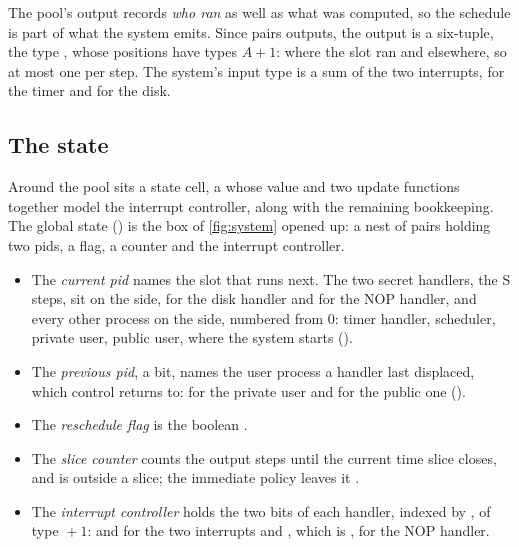 The pool's output records \emph{who ran} as well as what was computed, so the schedule
is part of what the system emits. Since  pairs outputs, the output is a
six-tuple, the type , whose positions have types $A + 1$:  where
the slot ran and  elsewhere, so at most one  per step. The
system's input type  is a sum of the two interrupts,  for the timer
and  for the disk.

\subsection{The state}\label{sec:global-state}\label{sec:state}

Around the pool sits a state cell, a  whose value and two update
functions together model the interrupt controller, along with
the remaining bookkeeping.
The global state () is the box of \cref{fig:system}
opened up: a nest of pairs holding two pids, a flag, a counter and the interrupt
controller.

\begin{itemize}
\item The \emph{current pid} names the slot that runs next. The two secret
  handlers, the S steps, sit on the  side,  for the disk handler and
   for the NOP handler, and every other process on the 
  side, numbered from 0: timer handler, scheduler, private user, public user, where
  the system starts ().
\item The \emph{previous pid}, a bit, names the user process a handler last
  displaced, which control returns to:  for the private user and
   for the public one ().
\item The \emph{reschedule flag} is the boolean .
\item The \emph{slice counter}  counts the output steps until
  the current time slice closes, and is  outside a slice; the immediate
  policy leaves it .
\item The \emph{interrupt controller}  holds the two bits of each handler,
  indexed by , of type ${} + 1$:  and
   for the two interrupts and , which is ,
  for the NOP handler.
\end{itemize}

